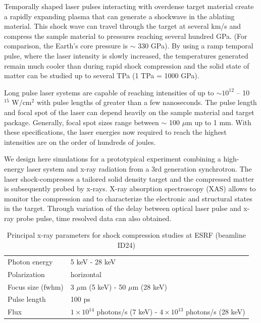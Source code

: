 \documentclass[12pt]{scrartcl}
\begin{document}
Temporally shaped laser pulses interacting with overdense target material create
a rapidly expanding plasma that can generate a shockwave in the ablating
material. This shock wave can travel through the target at several km/s and
compress the sample material to pressures reaching several hundred GPa. (For
comparison, the Earth's core pressure is $\sim$ 330 GPa). By using a ramp
temporal pulse, where the laser intensity is slowly increased, the temperatures
generated remain much cooler than during rapid shock compression and the solid
state of matter can be studied up to several TPa (1 TPa = 1000 GPa).

Long pulse laser systems are capable of reaching intensities of up to $\sim
10^{12}$ -- 10$^{15} \text{ W}/\text{cm}^2$ with pulse lengths of greater than a
few nanoseconds. The pulse length and focal spot of the laser can depend heavily
on the sample material and target package. Generally, focal spot sizes range
between $\sim$ 100 $\mu$m up to 1 mm. With these specifications, the laser
energies now required to reach the highest intensities are on the order of
hundreds of joules.

We design here simulations for a prototypical experiment combining a high-energy
laser system and x-ray radiation from a 3rd generation synchrotron. The laser
shock-compresses a tailored solid density target and the compressed matter is
subsequently probed by x-rays. X-ray absorption spectroscopy (XAS) allows to
monitor the compression and to characterize the electronic and structural states
in the target. Through variation of the delay between optical laser pulse and
x-ray probe pulse, time resolved data can also obtained.

\begin{table}
  \centering
  \begin{tabular}{l|l}
    \hline
    \hline
    Photon energy & 5 keV - 28 keV \\
    Polarization & horizontal \\
    Focus size (fwhm) & 3 $\mu$m (5 keV) - 50 $\mu$m (28 keV)\\
    Pulse length & 100 ps\\
    Flux  & $1\times 10^{14}$ photons/s (7 keV) - $4\times 10^{13}$ photons/s (28 keV) \\
    \hline
    \hline
  \end{tabular}
  \caption{Principal x-ray parameters for shock compression studies at ESRF
  (beamline ID24)}
  \label{tab:esrf_parameters}
\end{table}
\end{document}
